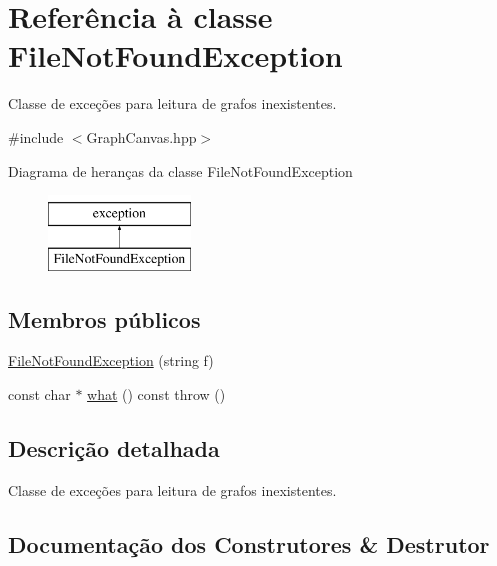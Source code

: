 \hypertarget{classFileNotFoundException}{}\section{Referência à classe File\+Not\+Found\+Exception}
\label{classFileNotFoundException}


Classe de exceções para leitura de grafos inexistentes.  




{\ttfamily \#include $<$Graph\+Canvas.\+hpp$>$}

Diagrama de heranças da classe File\+Not\+Found\+Exception\begin{figure}[H]
\begin{center}
\leavevmode
\includegraphics[height=2.000000cm]{classFileNotFoundException}
\end{center}
\end{figure}
\subsection*{Membros públicos}
\begin{DoxyCompactItemize}
\item 
\hyperlink{classFileNotFoundException_a9d496f2fcb769c4ae3f2ba1bd5c4840c}{File\+Not\+Found\+Exception} (string f)
\item 
const char $\ast$ \hyperlink{classFileNotFoundException_a7b845599455543d92dffe50950f5fa8d}{what} () const  throw ()
\end{DoxyCompactItemize}


\subsection{Descrição detalhada}
Classe de exceções para leitura de grafos inexistentes. 

\subsection{Documentação dos Construtores \& Destrutor}
\mbox{\label{classFileNotFoundException_a9d496f2fcb769c4ae3f2ba1bd5c4840c}} 
